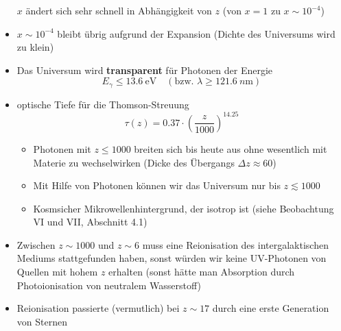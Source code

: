 \begin{itemize}
		$x$ ändert sich sehr schnell in Abhängigkeit von $z$ (von $x=1$ zu $x\sim 10^{-4}$)
	\item $x\sim 10^{-4}$ bleibt übrig aufgrund der Expansion (Dichte des Universums wird zu klein)
	\item Das Universum wird \textbf{transparent} für Photonen der Energie
		\begin{equation*}
			E_\gamma\leq\SI{13.6}{\eV}\quad(\text{bzw. }\lambda\geq\SI{121.6}{n\m})
		\end{equation*}
	\item optische Tiefe für die Thomson-Streuung
		\begin{equation*}
			\tau(z)=\num{0.37}\cdot\left(\frac{z}{1000}\right)^{\num{14.25}}
		\end{equation*}
		\begin{itemize}
			\item Photonen mit $z\leq 1000$ breiten sich bis heute aus ohne wesentlich mit Materie zu wechselwirken (Dicke des Übergangs $\Delta z\approx\num{60}$)
			\item Mit Hilfe von Photonen können wir das Universum nur bis $z\lesssim 1000$
			\item Kosmsicher Mikrowellenhintergrund, der isotrop ist (siehe Beobachtung VI und VII, Abschnitt 4.1)
		\end{itemize}
	\item Zwischen $z\sim 1000$ und $z\sim 6$ muss eine Reionisation des intergalaktischen Mediums stattgefunden haben, sonst würden wir keine UV-Photonen von Quellen mit hohem $z$ erhalten (sonst hätte man Absorption durch Photoionisation von neutralem Wasserstoff)
	\item Reionisation passierte (vermutlich) bei $z\sim 17$ durch eine erste Generation von Sternen
\end{itemize}
